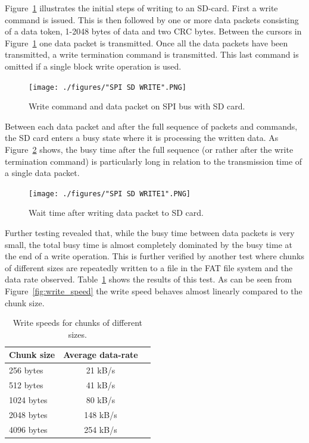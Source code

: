 Figure~\ref{fig:sd_card_write} illustrates the initial steps of writing to an SD-card. First a write command is issued. This is then followed by one or more data packets consisting of a data token, 1-2048 bytes of data and two CRC bytes. Between the cursors in Figure~\ref{fig:sd_card_write} one data packet is transmitted. Once all the data packets have been transmitted, a write termination command is transmitted. This last command is omitted if a single block write operation is used.

\begin{figure}[H]
    \centering \texttt{[image: ./figures/"SPI SD WRITE".PNG]}
    \caption{Write command and data packet on SPI bus with SD card.}
    \label{fig:sd_card_write}
\end{figure}

Between each data packet and after the full sequence of packets and commands, the SD card enters a busy state where it is processing the written data. As Figure~\ref{fig:sd_card_write_wait} shows, the busy time after the full sequence (or rather after the write termination command) is particularly long in relation to the transmission time of a single data packet.

\begin{figure}[H]
    \centering \texttt{[image: ./figures/"SPI SD WRITE1".PNG]}
    \caption{Wait time after writing data packet to SD card.}
    \label{fig:sd_card_write_wait}
\end{figure}

Further testing revealed that, while the busy time between data packets is very small, the total busy time is almost completely dominated by the busy time at the end of a write operation. This is further verified by another test where chunks of different sizes are repeatedly written to a file in the FAT file system and the data rate observed. Table~\ref{tab:write_speed} shows the results of this test. As can be seen from Figure~\ref{fig:write_speed} the write speed behaves almost linearly compared to the chunk size.

\begin{table}[htbp]
    \caption{Write speeds for chunks of different sizes.}
    \label{tab:write_speed}
    \centering\begin{tabular}{@{}lcr@{}} \toprule
    \textbf{Chunk size} & \textbf{Average data-rate} \\ \midrule
        256 bytes & 21 kB/s \\
        512 bytes & 41 kB/s \\
        1024 bytes & 80 kB/s \\
        2048 bytes & 148 kB/s \\
        4096 bytes & 254 kB/s \\ \bottomrule
    \end{tabular}
\end{table}

